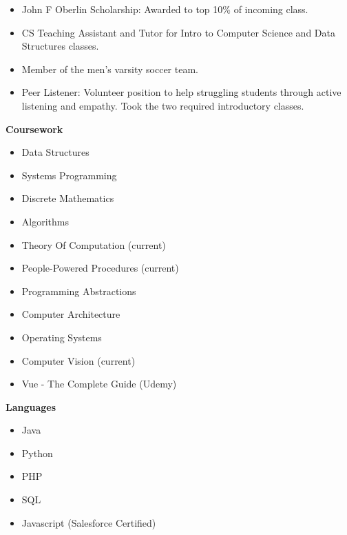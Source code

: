 \begin{itemize}
    \item John F Oberlin Scholarship: Awarded to top 10\% of incoming class.
    \item CS Teaching Assistant and Tutor for Intro to Computer Science and Data Structures classes.
    \item Member of the men's varsity soccer team.
    \item Peer Listener: Volunteer position to help struggling students through active listening and empathy. Took the two required introductory classes.
\end{itemize}
\textbf{Coursework}
\vspace*{-10px}
\begin{multicols*}{2}
\begin{itemize}
    \item Data Structures
    \item Systems Programming
    \item Discrete Mathematics
    \item Algorithms 
    \item Theory Of Computation (current)
    \item People-Powered Procedures (current)
    \vfill\null
    \item Programming Abstractions
    \item Computer Architecture
    \item Operating Systems
    \item Computer Vision (current)
    \item Vue - The Complete Guide (Udemy)
    
\end{itemize}
\end{multicols*}
\textbf{Languages}
\vspace*{-10px}
\begin{multicols}{2}
\begin{itemize}
    \item Java
    \item Python
    \item PHP
    \item SQL
    \item Javascript (Salesforce Certified)
\end{itemize}
\end{multicols}

